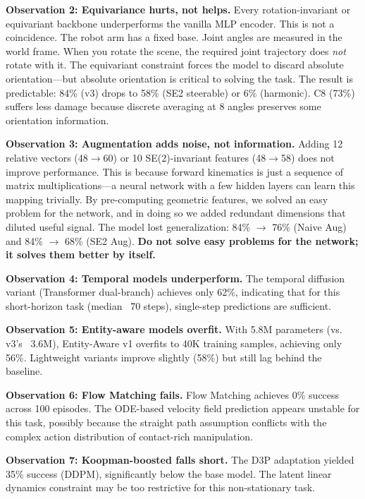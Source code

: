 \documentclass[twocolumn]{article}
\begin{document}
\textbf{Observation 2: Equivariance hurts, not helps.} Every rotation-invariant or equivariant backbone underperforms the vanilla MLP encoder. This is not a coincidence. The robot arm has a fixed base. Joint angles are measured in the world frame. When you rotate the scene, the required joint trajectory does \emph{not} rotate with it. The equivariant constraint forces the model to discard absolute orientation---but absolute orientation is critical to solving the task. The result is predictable: 84\% (v3) drops to 58\% (SE2 steerable) or 6\% (harmonic). C8 (73\%) suffers less damage because discrete averaging at 8 angles preserves some orientation information.

\textbf{Observation 3: Augmentation adds noise, not information.} Adding 12 relative vectors (48$\rightarrow$60) or 10 SE(2)-invariant features (48$\rightarrow$58) does not improve performance. This is because forward kinematics is just a sequence of matrix multiplications---a neural network with a few hidden layers can learn this mapping trivially. By pre-computing geometric features, we solved an easy problem for the network, and in doing so we added redundant dimensions that diluted useful signal. The model lost generalization: 84\% $\rightarrow$ 76\% (Naive Aug) and 84\% $\rightarrow$ 68\% (SE2 Aug). \textbf{Do not solve easy problems for the network; it solves them better by itself.}

\textbf{Observation 4: Temporal models underperform.} The temporal diffusion variant (Transformer dual-branch) achieves only 62\%, indicating that for this short-horizon task (median ~70 steps), single-step predictions are sufficient.

\textbf{Observation 5: Entity-aware models overfit.} With 5.8M parameters (vs. v3's ~3.6M), Entity-Aware v1 overfits to 40K training samples, achieving only 56\%. Lightweight variants improve slightly (58\%) but still lag behind the baseline.

\textbf{Observation 6: Flow Matching fails.} Flow Matching achieves 0\% success across 100 episodes. The ODE-based velocity field prediction appears unstable for this task, possibly because the straight path assumption conflicts with the complex action distribution of contact-rich manipulation.

\textbf{Observation 7: Koopman-boosted falls short.} The D3P adaptation yielded 35\% success (DDPM), significantly below the base model. The latent linear dynamics constraint may be too restrictive for this non-stationary task.
\end{document}
